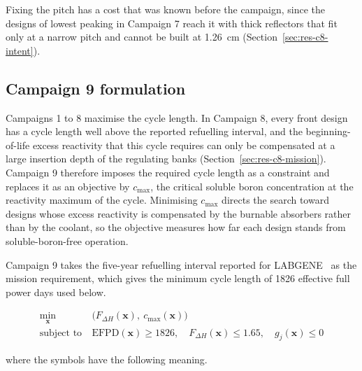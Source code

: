 Fixing the pitch has a cost that was known before the campaign, since
the designs of lowest peaking in Campaign 7 reach it with thick
reflectors that fit only at a narrow pitch and cannot be built at \SI{1.26}{cm} (Section~\ref{sec:res-c8-intent}).

\subsection{Campaign 9 formulation}
\label{sec:meth-c9}

Campaigns 1 to 8 maximise the cycle length. In Campaign 8, every front
design has a cycle length well above the reported refuelling interval,
and the beginning-of-life excess reactivity that this cycle requires
can only be compensated at a large insertion depth of the regulating
banks
(Section~\ref{sec:res-c8-mission}). Campaign 9 therefore imposes the
required cycle length as a constraint and replaces it as an objective
by $c_\mathrm{max}$, the critical soluble boron concentration at the
reactivity maximum of the cycle. Minimising $c_\mathrm{max}$ directs the
search toward designs whose excess reactivity is compensated by the
burnable absorbers rather than by the coolant, so the objective
measures how far each design stands from soluble-boron-free operation.

Campaign 9 takes the five-year refuelling interval reported for LABGENE~\cite{dinizcosta_2017} as the mission requirement, which
gives the minimum cycle length of 1826 effective full power days used below.

\begin{equation}
\begin{aligned}
\min_{\mathbf{x}}\ &\big(F_{\Delta H}(\mathbf{x}),\ c_\mathrm{max}(\mathbf{x})\big) \\
\text{subject to}\ &\mathrm{EFPD}(\mathbf{x}) \ge 1826,\quad
F_{\Delta H}(\mathbf{x}) \le 1.65,\quad g_j(\mathbf{x}) \le 0
\end{aligned}
\label{eq:c9-problem}
\end{equation}

\noindent where the symbols have the following meaning.

